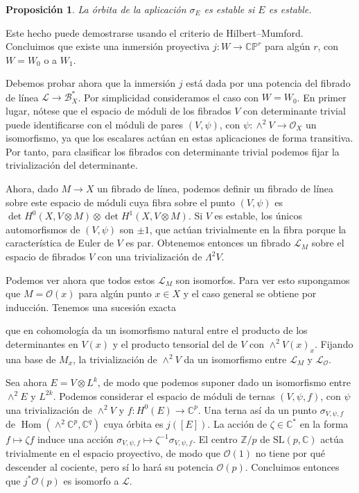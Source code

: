\documentclass[12pt, a4paper]{amsart}
\newcommand\CC{\mathbb{C}}
\newcommand\PP{\mathbb{P}}
\newcommand\SL{\mathrm{SL}}
\newcommand\BB{\mathcal{B}}
\newcommand\LL{\mathscr{L}}
\newcommand\OO{\mathscr{O}}
\DeclareMathOperator\Hom{Hom}
\newtheorem{prop}[thm]{Proposición}
\theoremstyle{remark} \newtheorem{rmk}[thm]{Observación}
\theoremstyle{remark} \newtheorem{rmks}[thm]{Observaciones}
\theoremstyle{definition} \newtheorem{defn}[thm]{Definición}
\theoremstyle{definition} \newtheorem{ejs}[thm]{Ejemplos}
\theoremstyle{definition} \newtheorem{ej}[thm]{Ejemplo}
\begin{document}
\begin{prop}
La órbita de la aplicación $\sigma_E$ es estable si $E$ es estable.	
\end{prop}

Este hecho puede demostrarse usando el criterio de Hilbert--Mumford. Concluimos que existe una inmersión proyectiva $j:W\rightarrow \CC\PP^r$ para algún $r$, con $W=W_0$ o a $W_1$.

Debemos probar ahora que la inmersión $j$ está dada por una potencia del fibrado de línea $\LL\rightarrow \BB^*_X$. Por simplicidad consideramos el caso con $W=W_0$. En primer lugar, nótese que el espacio de móduli de los fibrados $V$ con determinante trivial puede identificarse con el móduli de pares  $(V,\psi)$, con $\psi:\wedge^2 V\rightarrow \OO_X$ un isomorfismo, ya que los escalares actúan en estas aplicaciones de forma transitiva. Por tanto, para clasificar los fibrados con determinante trivial podemos fijar la trivialización del determinante. 

Ahora, dado $M\rightarrow X$ un fibrado de línea, podemos definir un fibrado de línea sobre este espacio de móduli cuya fibra sobre el punto $(V,\psi)$ es $\det H^0(X,V\otimes M) \otimes \det H^1(X,V\otimes M)$. Si $V$ es estable, los únicos automorfismos de $(V,\psi)$ son $\pm 1$, que actúan trivialmente en la fibra porque la característica de Euler de $V$ es par. Obtenemos entonces un fibrado $\LL_M$ sobre el espacio de fibrados $V$ con una trivialización de $\Lambda^2 V$. 

Podemos ver ahora que todos estos $\LL_M$ son isomorfos. Para ver esto supongamos que $M=\OO(x)$ para algún punto $x\in X$ y el caso general se obtiene por inducción. Tenemos una sucesión exacta
\begin{center}
\end{center}
que en cohomología da un isomorfismo natural entre  el producto de los determinantes en $V(x)$ y  el producto tensorial del de $V$ con $\wedge^2 V(x)_x$. Fijando una base de $M_x$, la trivialización de $\wedge^2 V$ da un isomorfismo entre $\LL_M$ y  $\LL_\OO$.

Sea ahora $E=V\otimes L^k$, de modo que podemos suponer dado un isomorfismo entre $\wedge^2 E$ y $L^{2k}$. Podemos considerar el espacio de móduli de ternas $(V,\psi,f)$, con $\psi$ una trivialización de $\wedge^2 V$ y $f:H^0(E)\rightarrow \CC^p$. Una terna así da un punto $\sigma_{V,\psi,f}$ de $\Hom(\wedge^2 \CC^p,\CC^q)$ cuya órbita es $j([E])$. La acción de $\zeta \in\CC^*$ en la forma $f \mapsto \zeta f$ induce una acción  $\sigma_{V,\psi,f}\mapsto \zeta^{-1}\sigma_{V,\psi,f}$. El centro $\mathbb{Z}/p$ de $\SL(p,\CC)$ actúa trivialmente en el espacio proyectivo, de modo que $\OO(1)$ no tiene por qué descender al cociente, pero sí lo hará su potencia $\OO(p)$. Concluimos entonces que $j^*\OO(p)$ es isomorfo a $\LL$.
\end{document}
